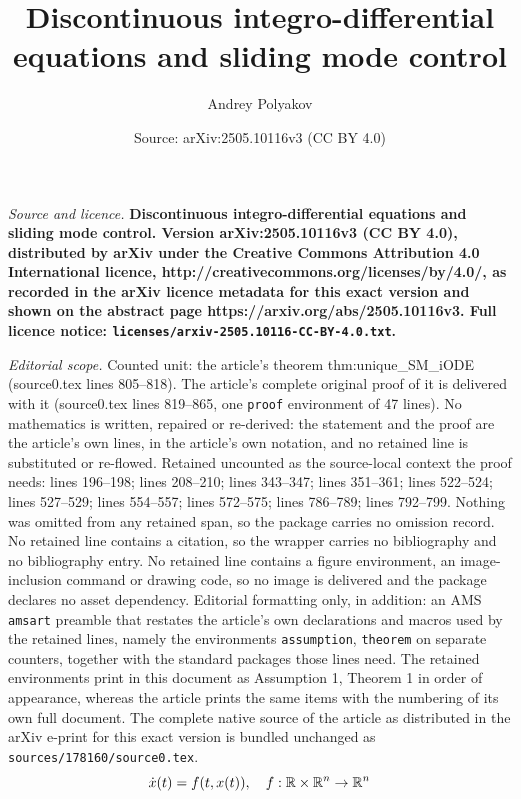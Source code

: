 \documentclass[10pt,a4paper]{amsart}
\title{\LARGE \bf Discontinuous integro-differential equations and sliding mode control}
\author{Andrey Polyakov}
\date{Source: arXiv:2505.10116v3 (CC BY 4.0)}
\newcommand{\R}{\mathbb{R}}
\begin{document}
\maketitle

\noindent\emph{Source and licence.} \LARGE \bf Discontinuous integro-differential equations and sliding mode control. Version arXiv:2505.10116v3 (CC BY 4.0), distributed by arXiv under the Creative Commons Attribution 4.0 International licence, http://creativecommons.org/licenses/by/4.0/, as recorded in the arXiv licence metadata for this exact version and shown on the abstract page https://arxiv.org/abs/2505.10116v3. Full licence notice: \texttt{licenses/arxiv-2505.10116-CC-BY-4.0.txt}.\par\smallskip

\noindent\textit{Editorial scope.} Counted unit: the article's theorem thm:unique\_SM\_iODE (source0.tex lines 805--818). The article's complete original proof of it is delivered with it (source0.tex lines 819--865, one \texttt{proof} environment of 47 lines). No mathematics is written, repaired or re-derived: the statement and the proof are the article's own lines, in the article's own notation, and no retained line is substituted or re-flowed.  Retained uncounted as the source-local context the proof needs: lines 196--198; lines 208--210; lines 343--347; lines 351--361; lines 522--524; lines 527--529; lines 554--557; lines 572--575; lines 786--789; lines 792--799.  Nothing was omitted from any retained span, so the package carries no omission record.  No retained line contains a citation, so the wrapper carries no bibliography and no bibliography entry.  No retained line contains a figure environment, an image-inclusion command or drawing code, so no image is delivered and the package declares no asset dependency.  Editorial formatting only, in addition: an AMS \texttt{amsart} preamble that restates the article's own declarations and macros used by the retained lines, namely the environments \texttt{assumption}, \texttt{theorem} on separate counters, together with the standard packages those lines need.  The retained environments print in this document as Assumption 1, Theorem 1 in order of appearance, whereas the article prints the same items with the numbering of its own full document.  The complete native source of the article as distributed in the arXiv e-print for this exact version is bundled unchanged as \texttt{sources/178160/source0.tex}.
\begin{equation}\label{eq:ch2_generalsystem}
	\dot x(t) = f(t,x(t)), \quad f :\R \times \R^n\to  \R^n\vspace{-1mm}
\end{equation} 
\end{document}
